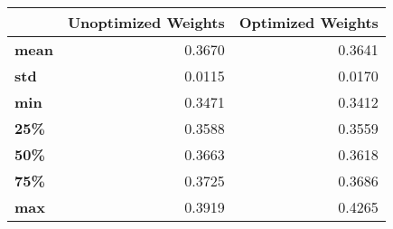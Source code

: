 \begin{tabular}{lrr}
\toprule
{} &  Unoptimized Weights &  Optimized Weights \\
\midrule
\textbf{mean} &               0.3670 &             0.3641 \\
\textbf{std } &               0.0115 &             0.0170 \\
\textbf{min } &               0.3471 &             0.3412 \\
\textbf{25\% } &               0.3588 &             0.3559 \\
\textbf{50\% } &               0.3663 &             0.3618 \\
\textbf{75\% } &               0.3725 &             0.3686 \\
\textbf{max } &               0.3919 &             0.4265 \\
\bottomrule
\end{tabular}
